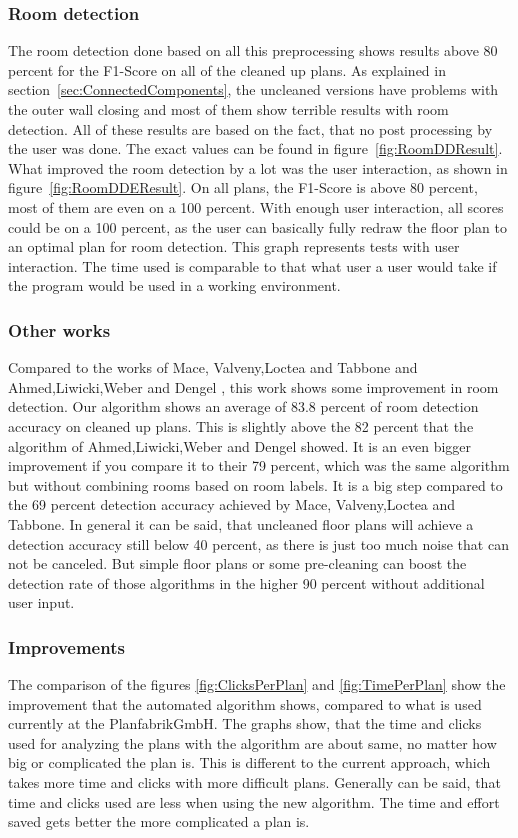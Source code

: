 \subsubsection{Room detection}
The room detection done based on all this preprocessing shows results above 80 percent for the F1-Score on all of the cleaned up plans. As explained in section~\ref{sec:ConnectedComponents}, the uncleaned versions have problems with the outer wall closing and most of them show terrible results with room detection. All of these results are based on the fact, that no post processing by the user was done. The exact values can be found in figure~\ref{fig:RoomDDResult}. What improved the room detection by a lot was the user interaction, as shown in figure~\ref{fig:RoomDDEResult}. On all plans, the F1-Score is above 80 percent, most of them are even on a 100 percent. With enough user interaction, all scores could be on a 100 percent, as the user can basically fully redraw the floor plan to an optimal plan for room detection. This graph represents tests with user interaction. The time used is comparable to that what user a user would take if the program would be used in a working environment.

\subsubsection{Other works}
Compared to the works of Mace, Valveny,Loctea and Tabbone \citep{mace_valveny_loctea_tabbone_2010} and Ahmed,Liwicki,Weber and Dengel \citep{ahmed_liwicki_weber_dengel_2012}, this work shows some improvement in room detection. Our algorithm shows an average of 83.8 percent of room detection accuracy on cleaned up plans. This is slightly above the 82 percent that the algorithm of Ahmed,Liwicki,Weber and Dengel showed. It is an even bigger improvement if you compare it to their 79 percent, which was the same algorithm but without combining rooms based on room labels. It is a big step compared to the 69 percent detection accuracy achieved by Mace, Valveny,Loctea and Tabbone. In general it can be said, that uncleaned floor plans will achieve a detection accuracy still below 40 percent, as there is just too much noise that can not be canceled. But simple floor plans or some pre-cleaning can boost the detection rate of those algorithms in the higher 90 percent without additional user input. 

\subsubsection{Improvements}
The comparison of the figures \ref{fig:ClicksPerPlan} and \ref{fig:TimePerPlan} show the improvement that the automated algorithm shows, compared to what is used currently at the PlanfabrikGmbH. The graphs show, that the time and clicks used for analyzing the plans with the algorithm are about same, no matter how big or complicated the plan is. This is different to the current approach, which takes more time and clicks with more difficult plans. Generally can be said, that time and clicks used are less when using the new algorithm. The time and effort saved gets better the more complicated a plan is. 

